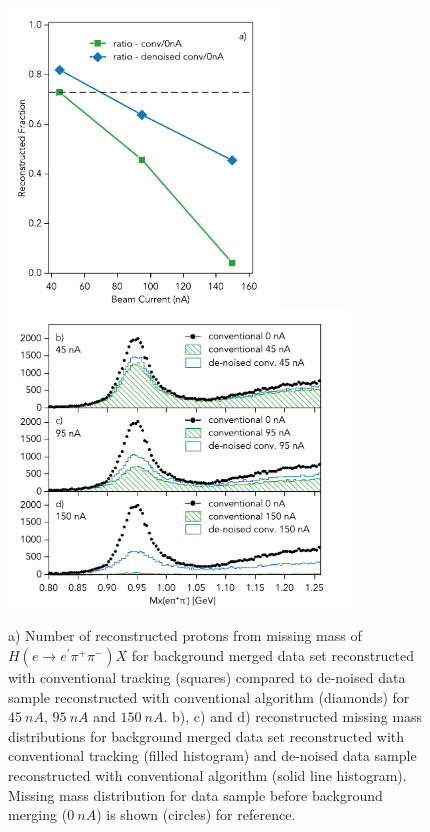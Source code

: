\begin{figure}[!h]
\begin{center}
  \includegraphics[height=3.1in]{images/graph_mxepipi_dn.pdf}
 \includegraphics[height=3.1in]{images/plots_mxepipi_dn.pdf}
\caption {a) Number of reconstructed protons from missing mass of $H(e \rightarrow e^\prime \pi^+\pi^-)X$ 
for background merged data set reconstructed with conventional tracking (squares) compared to de-noised data sample 
reconstructed with conventional algorithm (diamonds) for $45~nA$, $95~nA$ and $150~nA$. b), c) and d) reconstructed 
missing mass distributions for background merged data set reconstructed with conventional tracking (filled histogram) and
de-noised data sample reconstructed with conventional algorithm (solid line histogram). Missing mass distribution for
data sample before background merging ($0~nA$) is shown (circles) for reference. }
 \label{physics::conv_dn}
 \end{center}
\end{figure}


